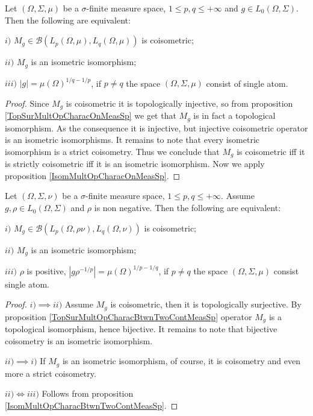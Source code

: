 \begin{proposition}\label{CoisomMultOpCharacOnMeasSp} Let $(\Omega,\Sigma,\mu)$ be a $\sigma$-finite measure space, $1\leq p,q\leq +\infty$ and $g\in L_0(\Omega,\Sigma)$. Then the following are equivalent:

$i)$ $M_g\in\mathcal{B}(L_p(\Omega,\mu),L_q(\Omega,\mu))$ is coisometric;

$ii)$ $M_g$ is an isometric isomorphism;

$iii)$ $|g|=\mu(\Omega)^{1/q-1/p}$, if $p\neq q$ the space $(\Omega,\Sigma,\mu)$ consist of single atom.
\end{proposition}
\begin{proof} Since $M_g$ is coisometric it is topologically injective, so from proposition \ref{TopSurMultOpCharacOnMeasSp} we get that $M_g$ is in fact a topological isomorphism. As the consequence it is injective, but injective coisometric operator is an isometric isomorphisms. It remains to note that every isometric isomorphism is a strict coisometry. Thus we conclude that $M_g$ is coisometric iff it is strictly coisometric iff it is an isometric isomorphism. Now we apply proposition \ref{IsomMultOpCharacOnMeasSp}.
\end{proof}

\begin{proposition}\label{CoisomMultOpCharacBtwnTwoContMeasSp} Let $(\Omega,\Sigma,\nu)$ be a $\sigma$-finite measure space, $1\leq p,q\leq +\infty$. Assume $g,\rho\in L_0(\Omega,\Sigma)$ and $\rho$ is non negative. Then the following are equivalent:

$i)$ $M_g\in\mathcal{B}(L_p(\Omega,\rho \nu),L_q(\Omega,\nu))$ is coisometric;

$ii)$ $M_g$ is an isometric isomorphism;

$iii)$ $\rho$ is positive, $|g  \rho^{-1/p}|=\mu(\Omega)^{1/p-1/q}$, if $p\neq q$ the space $(\Omega,\Sigma,\mu)$ consist single atom.
\end{proposition}
\begin{proof} $i)$$\implies$$ ii)$ Assume $M_g$ is coisometric, then it is topologically surjective. By proposition \ref{TopSurMultOpCharacBtwnTwoContMeasSp} operator $M_g$ is a topological isomorphism, hence bijective. It remains to note that bijective coisometry is an isometric isomorphism.

$ii)$$\implies$$ i)$ If $M_g$ is an isometric isomorphism, of course, it is coisometry and even more a strict coisometry.

$ii)\Longleftrightarrow iii)$ Follows from proposition \ref{IsomMultOpCharacBtwnTwoContMeasSp}.
\end{proof}

